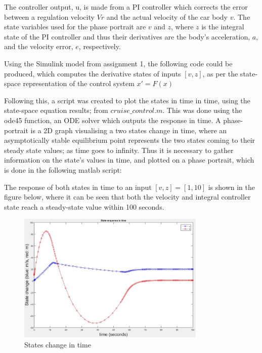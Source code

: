 \documentclass[12pt]{article}
\begin{document}
The controller output, u, is made from a PI controller which corrects the error between a regulation velocity $Vr$ and the actual velocity of the car body $v$. The state variables used for the phase portrait are $v$ and $z$, where $z$ is the integral state of the PI controller and thus their derivatives are the body's acceleration, $a$, and the velocity error, $e$, respectively.

Using the Simulink model from assignment 1, the following code could be produced, which computes the derivative states of inputs $[v, z]$, as per the state-space representation of the control system $x' = F(x)$

\vspace{\baselineskip}



\vspace{\baselineskip}

Following this, a script was created to plot the states in time in time, using the state-space equation results; from $cruise\_control.m$.
This was done using the ode45 function, an ODE solver which outputs the response in time. A phase-portrait is a 2D graph visualising a two states change in time, where an asymptotically stable equilibrium  point represents the two states coming to their steady state values; as time goes to infinity. Thus it is necessary to gather information on the state's values in time, and plotted on a phase portrait, which is done in the following matlab script:

\vspace{\baselineskip}



\vspace{\baselineskip}

The response of both states in time to an input $[v, z] = [1, 10]$ is shown in the figure below, where it can be seen that both the velocity and integral controller state reach a steady-state value within 100 seconds.

\begin{center}
\begin{figure}[htb]
	\includegraphics[width=0.8\textwidth]{A2_state_time.jpg}
\caption{States change in time}
\end{figure}
\end{center}
\end{document}
